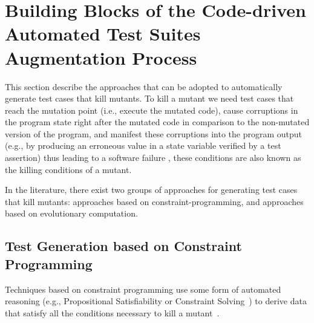 \clearpage
\section{Building Blocks of the Code-driven Automated Test Suites Augmentation Process}
\label{sec:testGeneration}

This section describe the approaches that can be adopted to automatically generate test cases that kill mutants.
To kill a mutant we need test cases that reach the mutation point (i.e., execute the mutated code), cause 
corruptions
in the program state right after the mutated code in comparison to the non-mutated version of the program, 
and manifest these corruptions into the program output 
(e.g., by producing an erroneous value in a state variable verified by a test assertion) 
thus leading to a software failure \cite{papadakis2019mutation}, these conditions are also known as the killing conditions of a mutant.

In the literature, there exist two groups of approaches for 
generating test cases that kill mutants:
approaches based on constraint-programming, and approaches based on evolutionary computation.

\subsection{Test Generation based on Constraint Programming}

Techniques based on constraint programming use some form of automated reasoning (e.g., Propositional Satisfiability or Constraint Solving~\cite{SATandCPsurvey:2006}) to derive data that satisfy all the conditions necessary to kill a mutant~\cite{offutt1997automatically}.

